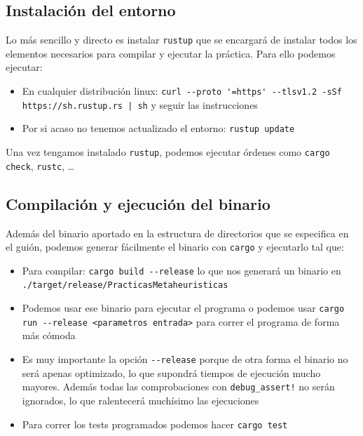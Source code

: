 \documentclass[11pt]{article}
\begin{document}
\subsection{Instalación del entorno}

Lo más sencillo y directo es instalar \lstinline{rustup} \footnotemark que se encargará de instalar todos los elementos necesarios para compilar y ejecutar la práctica. Para ello podemos ejecutar:

\begin{itemize}
    \item En cualquier distribución linux: \lstinline{curl --proto '=https' --tlsv1.2 -sSf https://sh.rustup.rs | sh} y seguir las instrucciones
    \item Por si acaso no tenemos actualizado el entorno: \lstinline{rustup update}
\end{itemize}

Una vez tengamos instalado \lstinline{rustup}, podemos ejecutar órdenes como \lstinline{cargo check}, \lstinline{rustc}, \ldots


\subsection{Compilación y ejecución del binario}

Además del binario aportado en la estructura de directorios que se especifica en el guión, podemos generar fácilmente el binario con \lstinline{cargo} y ejecutarlo tal que:

\begin{itemize}
    \item Para compilar: \lstinline{cargo build --release} lo que nos generará un binario en \lstinline{./target/release/PracticasMetaheuristicas}
    \item Podemos usar ese binario para ejecutar el programa o podemos usar \lstinline{cargo run --release <parametros entrada>} para correr el programa de forma más cómoda
    \item Es muy importante la opción \lstinline{--release} porque de otra forma el binario no será apenas optimizado, lo que supondrá tiempos de ejecución mucho mayores. Además todas las comprobaciones con \lstinline{debug_assert!} no serán ignorados, lo que ralentecerá muchísimo las ejecuciones
    \item Para correr los tests programados podemos hacer \lstinline{cargo test}
\end{itemize}
\end{document}

